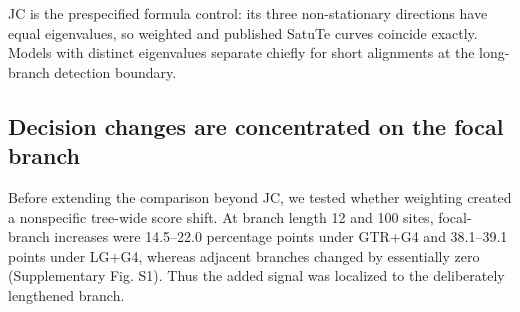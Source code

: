 JC is the prespecified formula control: its three non-stationary directions have equal eigenvalues, so weighted and published SatuTe curves coincide exactly. Models with distinct eigenvalues separate chiefly for short alignments at the long-branch detection boundary.

\subsection*{Decision changes are concentrated on the focal branch}

Before extending the comparison beyond JC, we tested whether weighting created a nonspecific tree-wide score shift. At branch length 12 and 100 sites, focal-branch increases were 14.5--22.0 percentage points under GTR+G4 and 38.1--39.1 points under LG+G4, whereas adjacent branches changed by essentially zero (Supplementary Fig. S1). Thus the added signal was localized to the deliberately lengthened branch.
